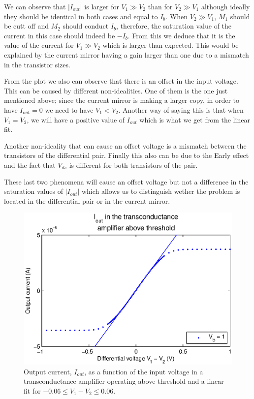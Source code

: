 We can observe that \(|I_{out}|\) is larger for \(V_1\gg V_2\) than for \(V_2\gg V_1\) although ideally they should be identical in both cases and equal to \(I_b\). When \(V_2\gg V_1\), \(M_1\) should be cutt off and \(M_2\) should conduct \(I_b\), therefore, the saturation value of the current in this case should indeed be \(-I_b\). From this we deduce that it is the value of the current for \(V_1\gg V_2\) which is larger than expected. This would be explained by the current mirror having  a gain larger than one due to a mismatch in the transistor sizes. 

From the plot we also can observe that there is an offset in the input voltage. This can be caused by different non-idealities. One of them is the one just mentioned above; since the current mirror is making a larger copy, in order to have \(I_{out}=0\) we need to have \(V_1<V_2\). Another way of saying this is that when \(V_1=V_2\), we will have a positive value of \(I_{out}\) which is what we get from the linear fit. 

Another non-ideality that can cause an offset voltage is a mismatch between the transistors of the differential pair. Finally this also can be due to the Early effect and the fact that \(V_{ds}\) is different for both transistors of the pair. 

These last two phenomena will cause an offset voltage but not a difference in the saturation values of \(|I_{out}|\) which allows us to distinguish wether the problem is located in the differential pair or in the current mirror. 


\begin{figure}[!htb]
	\center
	\includegraphics{q3b.eps}
	\caption{Output current, \(I_{out}\), as a function of the input voltage in a transconductance amplifier operating above threshold and a linear fit for \(-0.06 \le V_1-V_2 \le 0.06\).}
	\label{fig:ex3b}
\end{figure}


